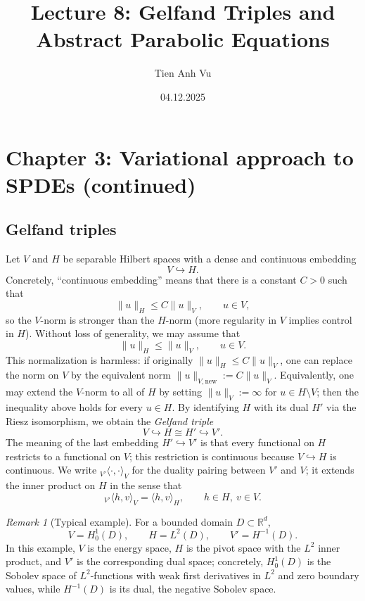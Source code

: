 \documentclass[11pt]{article}
\title{Lecture 8: Gelfand Triples and Abstract Parabolic Equations}
\date{04.12.2025}
\author{Tien Anh Vu}
\theoremstyle{definition}
\theoremstyle{remark}
\newtheorem{remark}{Remark}
\newcommand{\dual}[2]{{}_{V'}\langle #1, #2 \rangle_{V}}
\begin{document}
\maketitle

\section*{Chapter 3: Variational approach to SPDEs (continued)}

\subsection*{Gelfand triples}

Let $V$ and $H$ be separable Hilbert spaces with a dense and continuous embedding
\[
V \hookrightarrow H.
\]
Concretely, ``continuous embedding'' means that there is a constant $C>0$ such that
\[
\|u\|_H \le C\|u\|_V,
\qquad
u\in V,
\]
so the $V$-norm is stronger than the $H$-norm (more regularity in $V$ implies control in $H$).
Without loss of generality, we may assume that
\[
\|u\|_H \le \|u\|_V,
\qquad
u\in V.
\]
This normalization is harmless: if originally $\|u\|_H\le C\|u\|_V$, one can replace the norm on $V$
by the equivalent norm $\|u\|_{V,\mathrm{new}}:=C\|u\|_V$.
Equivalently, one may extend the $V$-norm to all of $H$ by setting $\|u\|_V:=\infty$ for
$u\in H\setminus V$; then the inequality above holds for every $u\in H$.
By identifying $H$ with its dual $H'$ via the Riesz isomorphism, we obtain the \emph{Gelfand triple}
\[
V \hookrightarrow H \cong H' \hookrightarrow V'.
\]
The meaning of the last embedding $H'\hookrightarrow V'$ is that every functional on $H$ restricts
to a functional on $V$; this restriction is continuous because $V\hookrightarrow H$ is continuous.
We write $\dual{\cdot}{\cdot}$ for the duality pairing between $V'$ and $V$; it extends the inner product on $H$ in the sense that
\[
\dual{h}{v} = \langle h,v\rangle_H,
\qquad
h\in H,\ v\in V.
\]

\begin{remark}[Typical example]
For a bounded domain $D\subset\mathbb{R}^d$,
\[
V = H_0^1(D),
\qquad
H = L^2(D),
\qquad
V' = H^{-1}(D).
\]
In this example, $V$ is the energy space, $H$ is the pivot space with the $L^2$ inner product,
and $V'$ is the corresponding dual space; concretely, $H_0^1(D)$ is the Sobolev space of
$L^2$-functions with weak first derivatives in $L^2$ and zero boundary values, while
$H^{-1}(D)$ is its dual, the negative Sobolev space.
\end{remark}
\end{document}
